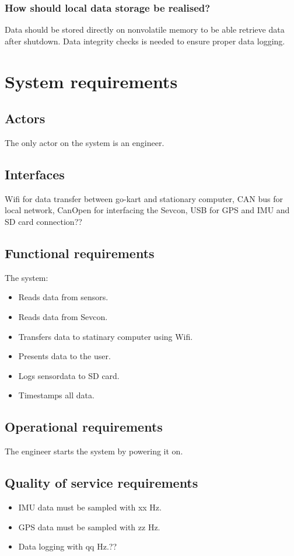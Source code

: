 \subsubsection*{How should local data storage be realised?}
Data should be stored directly on nonvolatile memory to be able retrieve data after shutdown.
Data integrity checks is needed to ensure proper data logging.


\newpage
\section{System requirements}

\subsection{Actors}
The only actor on the system is an engineer.

\subsection{Interfaces}
Wifi for data transfer between go-kart and stationary computer, CAN bus for local network,  CanOpen for interfacing the Sevcon, USB for GPS and IMU and SD card connection??

\subsection{Functional requirements}
The system: 
\begin{itemize}
\item Reads data from sensors.
\item Reads data from Sevcon.
\item Transfers data to statinary computer using Wifi.
\item Presents data to the user.
\item Logs sensordata to SD card.
\item Timestamps all data. 
\end{itemize}

\subsection{Operational requirements}
The engineer starts the system by powering it on.

\subsection{Quality of service requirements}
\begin{itemize}
\item IMU data must be sampled with xx Hz.
\item GPS data must be sampled with zz Hz.
\item Data logging with qq Hz.??
\end{itemize}

